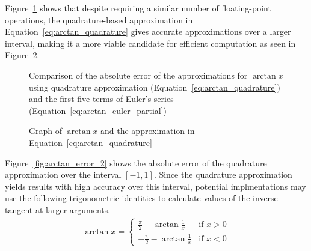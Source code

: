 Figure~\ref{fig:arctan_error} shows that despite requiring a similar number of floating-point operations, the quadrature-based approximation in Equation~\ref{eq:arctan_quadrature} gives accurate approximations over a larger interval, making it a more viable candidate for efficient computation as seen in Figure~\ref{fig:arctan_comparison}.
\begin{figure}[!ht]
	\centering
	\caption{Comparison of the absolute error of the approximations for $\arctan x$ using quadrature approximation (Equation~\ref{eq:arctan_quadrature}) and the first five terms of Euler's series (Equation~\ref{eq:arctan_euler_partial})}
	\label{fig:arctan_error}
\end{figure}

\begin{figure}[ht]
	\centering
	\caption{Graph of $\arctan x$ and the approximation in Equation~\ref{eq:arctan_quadrature}}
	\label{fig:arctan_comparison}
\end{figure}

Figure~\ref{fig:arctan_error_2} shows the absolute error of the quadrature approximation over the interval $[-1,1]$. Since the quadrature approximation yields results with high accuracy over this interval, potential implmentations may use the following trigonometric identities to calculate values of the inverse tangent at larger arguments.
\begin{align*}
	\arctan x =
	\begin{cases}
		\frac{\pi}{2}-\arctan{\frac{1}{x}} & \text{if } x > 0 \\
		-\frac{\pi}{2}-\arctan{\frac{1}{x}} & \text{if } x < 0 
	\end{cases}
\end{align*}

